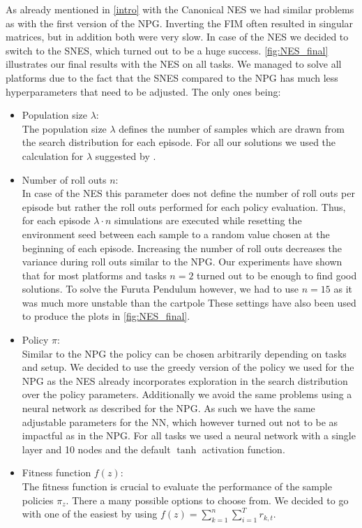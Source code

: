 As already mentioned in \autoref{intro} with the Canonical NES we had similar problems as with the first version of the NPG. Inverting the FIM often resulted in singular matrices, but in addition both were very slow. In case of the NES we decided to switch to the SNES, which turned out to be a huge success. \autoref{fig:NES_final} illustrates our final results with the NES on all tasks. We managed to solve all platforms due to the fact that the SNES compared to the NPG has much less hyperparameters that need to be adjusted. The only ones being:
\begin{itemize}
  \item Population size $\lambda$: \\
  The population size $\lambda$ defines the number of samples which are drawn from the search distribution for each episode. For all our solutions we used the calculation for $\lambda$ suggested by \cite{Wierstra14}. \smallskip
  \item Number of roll outs $n$: \\
  In case of the NES this parameter does not define the number of roll outs per episode but rather the roll outs performed for each policy evaluation. Thus, for each episode $\lambda \cdot n$ simulations are executed while resetting the environment seed between each sample to a random value chosen at the beginning of each episode. Increasing the number of roll outs decreases the variance during roll outs similar to the NPG. Our experiments have shown that for most platforms and tasks $n=2$ turned out to be enough to find good solutions. To solve the Furuta Pendulum however, we had to use $n=15$ as it was much more unstable than the cartpole These settings have also been used to produce the plots in \autoref{fig:NES_final}. \smallskip
  \item Policy $\pi$: \\
  Similar to the NPG the policy can be chosen arbitrarily depending on tasks and setup. We decided to use the greedy version of the policy we used for the NPG as the NES already incorporates exploration in the search distribution over the policy parameters. Additionally we avoid the same problems using a neural network as described for the NPG. As such we have the same adjustable parameters for the NN, which however turned out not to be as impactful as in the NPG. For all tasks we used a neural network with a single layer and 10 nodes and the default $\tanh$ activation function. \smallskip
  \item Fitness function $f(z)$: \\
  The fitness function is crucial to evaluate the performance of the sample policies $\pi_z$. There a many possible options to choose from. We decided to go with one of the easiest by using $f(z) = \sum_{k=1}^{n} \sum_{i=1}^{T} r_{k,t}$.
\end{itemize}

